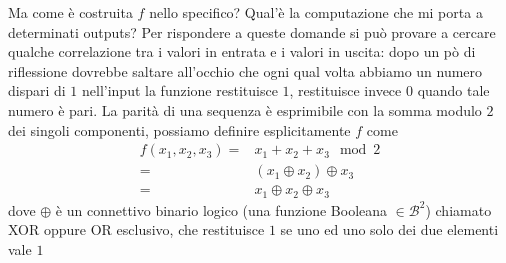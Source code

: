 \documentclass[12pt,a4paper,openright]{report}
\newcommand*\xor{\mathbin{\oplus}}
\begin{document}
\begin{center}
\end{center}
Ma come è costruita $f$ nello specifico? Qual'è la computazione che mi porta a determinati outputs?
Per rispondere a queste domande si può provare a cercare qualche correlazione tra i valori in entrata e i valori in uscita:
dopo un pò di riflessione dovrebbe saltare all'occhio che ogni qual volta abbiamo un numero dispari di $1$ nell'input la funzione 
restituisce $1$, restituisce invece $0$ quando tale numero è pari.
La parità di una sequenza è esprimibile con la somma modulo $2$ dei singoli componenti, possiamo definire esplicitamente $f$ come
\begin{align*}
    f(x_1, x_2, x_3)= &x_1 + x_2 + x_3 \mod 2  \\
                    = &(x_1 \xor x_2) \xor x_3  \\
                    = &x_1 \xor x_2 \xor x_3
\end{align*}
dove $\xor$ è un connettivo binario logico (una funzione Booleana $\in \mathcal{B}^2$) chiamato XOR oppure OR esclusivo, che restituisce $1$ se uno ed uno solo dei due 
elementi vale $1$  
\end{document}
